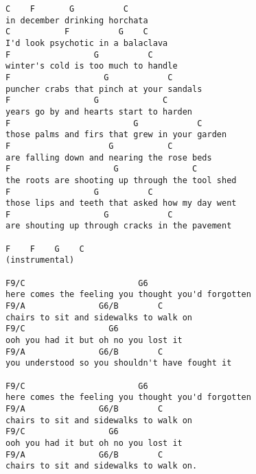 \documentclass[leqno]{memoir}
\begin{document}
\begin{verbatim}
C    F       G          C
in december drinking horchata
C           F          G    C
I'd look psychotic in a balaclava
F                 G          C
winter's cold is too much to handle
F                   G            C
puncher crabs that pinch at your sandals
F                 G             C
years go by and hearts start to harden
F                         G            C
those palms and firs that grew in your garden
F                    G           C
are falling down and nearing the rose beds
F                     G               C
the roots are shooting up through the tool shed
F                 G          C
those lips and teeth that asked how my day went
F                   G            C
are shouting up through cracks in the pavement

F    F    G    C
(instrumental)

F9/C                       G6
here comes the feeling you thought you'd forgotten
F9/A               G6/B        C
chairs to sit and sidewalks to walk on
F9/C                 G6
ooh you had it but oh no you lost it
F9/A               G6/B        C
you understood so you shouldn't have fought it

F9/C                       G6
here comes the feeling you thought you'd forgotten
F9/A               G6/B        C
chairs to sit and sidewalks to walk on
F9/C                 G6
ooh you had it but oh no you lost it
F9/A               G6/B        C
chairs to sit and sidewalks to walk on. 

\end{verbatim}
\newpage
\end{document}
